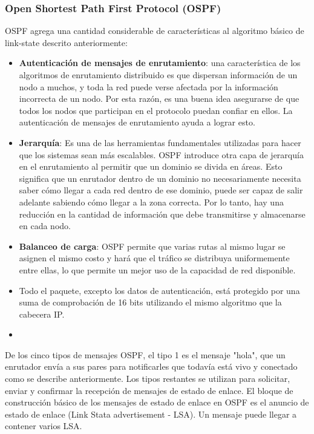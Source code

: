\subsubsection{Open Shortest Path First Protocol (OSPF)}
OSPF agrega una cantidad considerable de características al algoritmo básico de link-state descrito anteriormente:

\begin{itemize}
  \item \textbf{Autenticación de mensajes de enrutamiento}: una característica de los algoritmos de enrutamiento distribuido es que dispersan información de un nodo a muchos, y toda la red puede verse afectada por la información incorrecta de un nodo. Por esta razón, es una buena idea asegurarse de que todos los nodos que participan en el protocolo puedan confiar en ellos. La autenticación de mensajes de enrutamiento ayuda a lograr esto.
  \item \textbf{Jerarquía}: Es una de las herramientas fundamentales utilizadas para hacer que los sistemas sean más escalables. OSPF introduce otra capa de jerarquía en el enrutamiento al permitir que un dominio se divida en áreas. Esto significa que un enrutador dentro de un dominio no necesariamente necesita saber cómo llegar a cada red dentro de ese dominio, puede ser capaz de salir adelante sabiendo cómo llegar a la zona correcta. Por lo tanto, hay una reducción en la cantidad de información que debe transmitirse y almacenarse en cada nodo.
  \item \textbf{Balanceo de carga}: OSPF permite que varias rutas al mismo lugar se asignen el mismo costo y hará que el tráfico se distribuya uniformemente entre ellas, lo que permite un mejor uso de la capacidad de red disponible.
  \item Todo el paquete, excepto los datos de autenticación, está protegido por una suma de comprobación de 16 bits utilizando el mismo algoritmo que la cabecera IP.
  \item 
\end{itemize}

De los cinco tipos de mensajes OSPF, el tipo 1 es el mensaje "hola", que un enrutador envía a sus pares para notificarles que todavía está vivo y conectado como se describe anteriormente. Los tipos restantes se utilizan para solicitar, enviar y confirmar la recepción de mensajes de estado de enlace. El bloque de construcción básico de los mensajes de estado de enlace en OSPF es el anuncio de estado de enlace (Link Stata advertisement - LSA). Un mensaje puede llegar a contener varios LSA.

